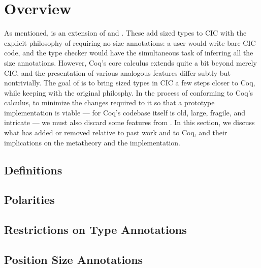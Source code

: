 \section{Overview}\label{sec:overview} %

As mentioned, \lang is an extension of \CIChat and \CIChatminus.
These add sized types to CIC with the explicit philosophy of requiring no size annotations:
a user would write bare CIC code, and the type checker would have the simultaneous task of inferring all the size annotations.
However, Coq's core calculus extends quite a bit beyond merely CIC,
and the presentation of various analogous features differ subtly but nontrivially.
The goal of \lang is to bring sized types in CIC a few steps closer to Coq,
while keeping with the original philosphy.
In the process of conforming to Coq's calculus, to minimize the changes required to it so that a prototype implementation is viable --- for Coq's codebase itself is old, large, fragile, and intricate --- we must also discard some features from \CIChatminus.
In this section, we discuss what \lang has added or removed relative to past work and to Coq,
and their implications on the metatheory and the implementation.

\subsection{Definitions}


\subsection{Polarities}


\subsection{Restrictions on Type Annotations}


\subsection{Position Size Annotations}


